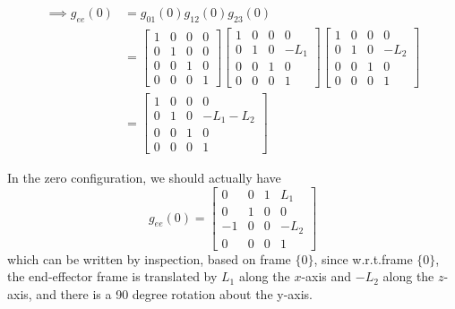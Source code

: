\begin{align*}
    \implies
    g_{e e}(0)
     & =
    g_{0 1}(0) g_{1 2}(0) g_{2 3}(0)
    \\ & =
    \begin{bmatrix}
        1 & 0 & 0 & 0 \\
        0 & 1 & 0 & 0 \\
        0 & 0 & 1 & 0 \\
        0 & 0 & 0 & 1
    \end{bmatrix}
    \begin{bmatrix}
        1 & 0 & 0 & 0    \\
        0 & 1 & 0 & -L_1 \\
        0 & 0 & 1 & 0    \\
        0 & 0 & 0 & 1
    \end{bmatrix}
    \begin{bmatrix}
        1 & 0 & 0 & 0    \\
        0 & 1 & 0 & -L_2 \\
        0 & 0 & 1 & 0    \\
        0 & 0 & 0 & 1
    \end{bmatrix}
    \\ & =
    \begin{bmatrix}
        1 & 0 & 0 & 0        \\
        0 & 1 & 0 & -L_1-L_2 \\
        0 & 0 & 1 & 0        \\
        0 & 0 & 0 & 1
    \end{bmatrix}
\end{align*}

\clearpage
In the zero configuration, we should actually have
\begin{equation*}
    g_{e e}(0)
    =
    \begin{bmatrix}
        0  & 0 & 1 & L_1  \\
        0  & 1 & 0 & 0    \\
        -1 & 0 & 0 & -L_2 \\
        0  & 0 & 0 & 1
    \end{bmatrix}
\end{equation*}
which can be written by inspection, based on frame \( \{0\} \), since w.r.t.\@ frame \( \{0\} \), the end-effector frame is translated by \( L_1 \) along the \( x \)-axis and \( -L_2 \) along the \( z \)-axis, and there is a 90 degree rotation about the y-axis.

